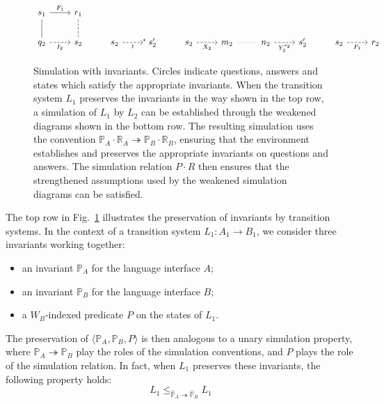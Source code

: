 \documentclass[draft,11pt]{report}
\begin{document}
\begin{figure}
\[\begin{tikzcd}
      |[alias=F11]| s_1 \ar[r, "F_1"] \ar[d, dash] &
      |[alias=F21]| r_1 \ar[d, dashed, dash]
      \\
      |[alias=I12]| q_2 \ar[r, "I_2"', dashed] &
      |[alias=I22]| s_2 &
      |[alias=R12]| s_2 \ar[r, "t"', dashed] &
      |[alias=R22]| \!\!\! {}^* \: s_2' &
      |[alias=X12]| s_2 \ar[r, "X_2"', dashed] &
      |[alias=X22]| m_2 \ar[r, dotted, dash] &
      |[alias=Y12]| n_2 \ar[r, "Y_2^{s_2}"', dashed] &
      |[alias=Y22]| s_2' &
      |[alias=F12]| s_2 \ar[r, "F_1"', dashed] &
      |[alias=F22]| r_2
    \end{tikzcd}
  \]
  \caption{Simulation with invariants.
    Circles indicate questions, answers and states
    which satisfy the appropriate invariants.
    When the transition system $L_1$ preserves the invariants
    in the way shown in the top row,
    a simulation of $L_1$ by $L_2$ can be established through
    the weakened diagrams shown in the bottom row.
    The resulting simulation uses the convention
    $\mathbb{P}_A \cdot \mathbb{R}_A \twoheadrightarrow
     \mathbb{P}_B \cdot \mathbb{R}_B$,
    ensuring that the environment
    establishes and preserves the appropriate invariants
    on questions and answers.
    The simulation relation $P \cdot R$ then ensures that
    the strengthened assumptions used by the
    weakened simulation diagrams can be satisfied.}
  \label{fig:fsim-inv}
\end{figure}

The top row in Fig.~\ref{fig:fsim-inv}
illustrates the preservation of invariants by transition systems.
In the context of a transition system
$L_1 : A_1 \rightarrow B_1$,
we consider three invariants working together:
\begin{itemize}
  \item an invariant $\mathbb{P}_A$ for the language interface $A$;
  \item an invariant $\mathbb{P}_B$ for the language interface $B$;
  \item a $W_B$-indexed predicate $P$ on the states of $L_1$.
\end{itemize}
The preservation of
$\langle \mathbb{P}_A, \mathbb{P}_B, P \rangle$
is then analogous to a unary simulation property,
where $\mathbb{P}_A \twoheadrightarrow \mathbb{P}_B$
play the roles of the simulation conventions,
and $P$ plays the role of the simulation relation.
In fact,
when $L_1$ preserves these invariants,
the following property holds:
\[
    L_1 \le_{\hat{\mathbb{P}}_A \twoheadrightarrow \hat{\mathbb{P}}_B} L_1
\]
\end{document}
